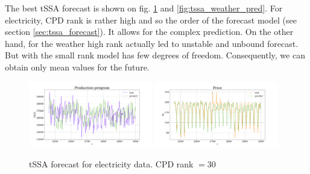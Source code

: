 \documentclass[referee, pdflatex]{sn-jnl}
\theoremstyle{definition}
\theoremstyle{plain}
\begin{document}
	The best tSSA forecast is shown on fig. \ref{fig:tssa_electr_pred} and \ref{fig:tssa_weather_pred}. For electricity, CPD rank is rather high and so the order of the forecast model (see section \ref{sec:tssa_forecast}). It allows for the complex prediction. On the other hand, for the weather high rank actually led to unstable and unbound forecast. But with the small rank model has few degrees of freedom. Consequently, we can obtain only mean values for the future.
	
	\begin{figure}[h]
		\centering
		\includegraphics[width=0.48\textwidth, keepaspectratio]{../../experiments/electricity/tssa/figs/prediction/cpd_rank_30/Production_program.png}
		\includegraphics[width=0.48\textwidth, keepaspectratio]{../../experiments/electricity/tssa/figs/prediction/cpd_rank_30/Price.png}
		\caption{tSSA forecast for electricity data. CPD rank $ = 30 $}\label{fig:tssa_electr_pred}
	\end{figure}
	
\end{document}
